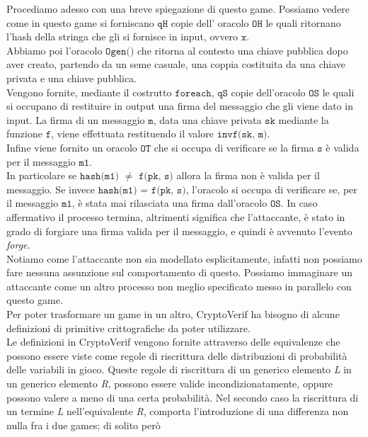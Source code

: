 \documentclass[a4paper,openright,twoside,12pt]{report}
\begin{document}
Procediamo adesso con una breve spiegazione di questo game.
Possiamo vedere come in questo game si forniscano $\texttt{qH}$ copie dell' oracolo $\texttt{OH}$ le quali ritornano l'hash della stringa che gli si fornisce in input, ovvero $\texttt{x}$.\\
Abbiamo poi l'oracolo $\texttt{Ogen()}$ che ritorna al contesto una chiave pubblica dopo aver creato, partendo da un seme casuale, una coppia costituita da una chiave privata e una chiave pubblica.\\
Vengono fornite, mediante il costrutto $\texttt{foreach}$, $\texttt{qS}$ copie dell'oracolo $\texttt{OS}$ le quali si occupano di restituire in output una firma del messaggio che gli viene dato in input.
La firma di un messaggio $\texttt{m}$, data una chiave privata $\texttt{sk}$ mediante la funzione $\texttt{f}$, viene effettuata restituendo il valore $\texttt{invf(sk, m)}$.\\ 
Infine viene fornito un oracolo $\texttt{OT}$ che si occupa di verificare se la firma $\texttt{s}$ \`e valida per il messaggio $\texttt{m1}$. \\
In particolare se $\texttt{hash(m1)}$ $\neq$ $\texttt{f(pk, s)}$ allora la firma non \`e valida per il messaggio. Se invece $\texttt{hash(m1) = f(pk, s)}$,
l'oracolo si occupa di verificare se, per il messaggio $\texttt{m1}$, \`e stata mai rilasciata una firma dall'oracolo $\texttt{OS}$. In caso affermativo il processo termina, altrimenti significa che 
l'attaccante, \`e stato in grado di forgiare una firma valida per il messaggio, e quindi \`e avvenuto l'evento \emph{forge}.\\
Notiamo come l'attaccante non sia modellato esplicitamente, infatti non possiamo fare nessuna assunzione sul comportamento di questo.
Possiamo immaginare un attaccante come un altro processo non meglio specificato messo in parallelo con questo game.\\ 
Per poter trasformare un game in un altro, CryptoVerif ha bisogno di alcune definizioni di primitive crittografiche da poter utilizzare.
\\
Le definizioni in CryptoVerif vengono fornite attraverso delle equivalenze che possono essere viste come regole di riscrittura 
delle distribuzioni di probabilit\`a delle variabili in gioco.
Queste regole di riscrittura di un generico elemento \emph{L} in un generico elemento \emph{R}, possono essere valide incondizionatamente, 
oppure possono valere a meno di una certa probabilit\`a.
Nel secondo caso la riscrittura di un termine \emph{L} nell'equivalente \emph{R}, comporta l'introduzione di una differenza non nulla fra i due games; di solito per\`o
\end{document}
